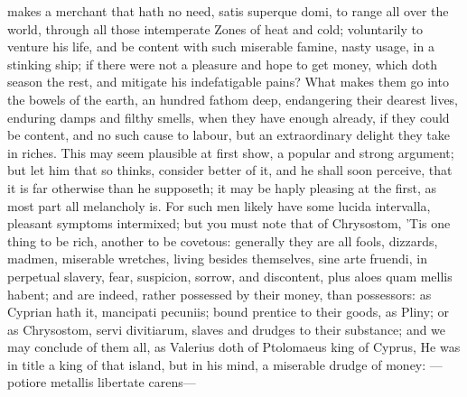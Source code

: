 {makes a merchant that hath no need, satis superque domi, to range all
over the world, through all those intemperate Zones of heat and
cold; voluntarily to venture his life, and be content with such
miserable famine, nasty usage, in a stinking ship; if there were not a
pleasure and hope to get money, which doth season the rest, and
mitigate his indefatigable pains? What makes them go into the bowels of
the earth, an hundred fathom deep, endangering their dearest lives,
enduring damps and filthy smells, when they have enough already, if
they could be content, and no such cause to labour, but an
extraordinary delight they take in riches. This may seem plausible at
first show, a popular and strong argument; but let him that so thinks,
consider better of it, and he shall soon perceive, that it is far
otherwise than he supposeth; it may be haply pleasing at the first, as
most part all melancholy is. For such men likely have some lucida
intervalla, pleasant symptoms intermixed; but you must note that of
Chrysostom, 'Tis one thing to be rich, another to be covetous:
generally they are all fools, dizzards, madmen, miserable
wretches, living besides themselves, sine arte fruendi, in perpetual
slavery, fear, suspicion, sorrow, and discontent, plus aloes quam
mellis habent; and are indeed, rather possessed by their money, than
possessors: as Cyprian hath it, mancipati pecuniis; bound
prentice to their goods, as Pliny; or as Chrysostom, servi
divitiarum, slaves and drudges to their substance; and we may conclude
of them all, as Valerius doth of Ptolomaeus king of Cyprus, He
was in title a king of that island, but in his mind, a miserable drudge
of money:
---potiore metallis
libertate carens---

}
